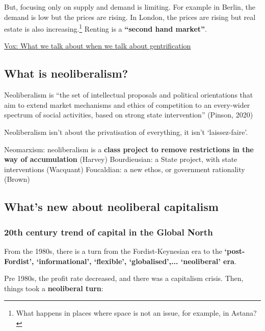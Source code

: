 \documentclass{article}
\begin{document}
But, focusing only on supply and demand is limiting. For example in Berlin, the demand is low but the prices are rising. In London, the prices are rising but real estate is also increasing.\footnote{What happens in places where space is not an issue, for example, in Astana?} 
Renting is a \textbf{``second hand market''}.

\href{https://www.vox.com/22629826/gentrification-definition-housing-racism-segregation-cities}{Vox:  What we talk about when we talk about gentrification}

\subsection{What is neoliberalism?}

Neoliberalism is ``the set of intellectual proposals and political orientations that aim to extend market mechanisms and ethics of competition to an every-wider spectrum of social activities, based on strong state intervention'' (Pinson, 2020)

Neoliberalism isn't about the privatisation of everything, it isn't `laissez-faire'. 

\begin{outline}
	\1 Neomarxism: neoliberalism is a \textbf{class project to remove restrictions in the way of accumulation} (Harvey)
	\1 Bourdieusian: a State project, with state interventions (Wacquant)
	\1 Foucaldian: a new ethos, or government rationality (Brown)
\end{outline}

\subsection{What's new about neoliberal capitalism}

\subsubsection{20th century trend of capital in the Global North}

From the 1980s, there is a turn from the Fordist-Keynesian era to the \textbf{`post-Fordist', `informational', `flexible', `globalised',... `neoliberal' era}. 

Pre 1980s, the profit rate decreased, and there was a capitalism crisis. Then, things took a \textbf{neoliberal turn}:
\end{document}
